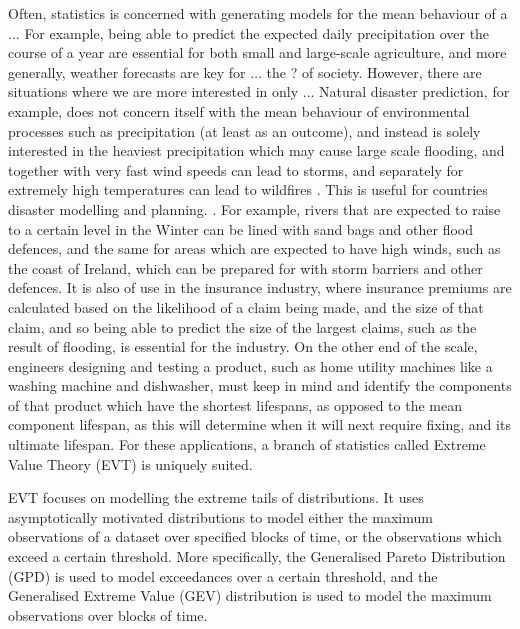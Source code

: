 \documentclass{article}
\numberwithin{equation}{section}
\begin{document}
Often, statistics is concerned with generating models for the mean behaviour of a $\ldots$ 
% 
For example, being able to predict the expected daily precipitation over the course of a year are essential for both small and large-scale agriculture, and more generally, weather forecasts are key for $\ldots$ the ? of society. 
However, there are situations where we are more interested in only ...
Natural disaster prediction, for example, does not concern itself with the mean behaviour of environmental processes such as precipitation (at least as an outcome), and instead is solely interested in the heaviest precipitation which may cause large scale flooding, and together with very fast wind speeds can lead to storms, and separately for extremely high temperatures can lead to wildfires .
This is useful for countries disaster modelling and planning. .
For example, rivers that are expected to raise to a certain level in the Winter can be lined with sand bags and other flood defences, and the same for areas which are expected to have high winds, such as the coast of Ireland, which can be prepared for with storm barriers and other defences. 
It is also of use in the insurance industry, where insurance premiums are calculated based on the likelihood of a claim being made, and the size of that claim, and so being able to predict the size of the largest claims, such as the result of flooding, is essential for the industry.
On the other end of the scale, engineers designing and testing a product, such as home utility machines like a washing machine and dishwasher, must keep in mind and identify the components of that product which have the shortest lifespans, as opposed to the mean component lifespan, as this will determine when it will next require fixing, and its ultimate lifespan.
For these applications, a branch of statistics called Extreme Value Theory (EVT) is uniquely suited.

EVT focuses on modelling the extreme tails of distributions.
It uses asymptotically motivated distributions to model either the maximum observations of a dataset over specified blocks of time, or the observations which exceed a certain threshold. 
More specifically, the Generalised Pareto Distribution (GPD) is used to model exceedances over a certain threshold, and the Generalised Extreme Value (GEV) distribution is used to model the maximum observations over blocks of time.
\end{document}
